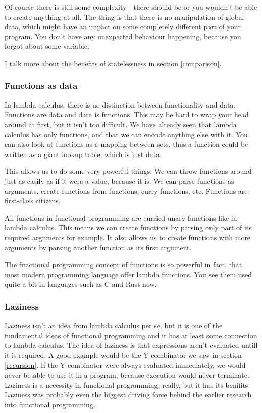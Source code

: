 \documentclass[11pt]{article}
\begin{document}
Of course there is still some complexity---there should be or you wouldn't be
able to create anything at all. The thing is that there is no manipulation of
global data, which might have an impact on some completely different part of
your program. You don't have any unexpected behaviour happening, because you
forgot about some variable.

I talk more about the benefits of statelessness in section \ref{comparison}.

\subsubsection{Functions as data}

In lambda calculus, there is no distinction between functionality and data.
Functions are data and data is functions. This may be hard to wrap your head
around at first, but it isn't too difficult. We have already seen that lambda
calculus has only functions, and that we can encode anything else with it. You
can also look at functions as a mapping between sets, thus a function could be
written as a giant lookup table, which is just data.

This allows us to do some very powerful things. We can throw functions around
just as easily as if it were a value, because it is. We can parse functions as
arguments, create functions from functions, curry functions, etc. Functions are
first-class citizens.

All functions in functional programming are curried unary functions like in
lambda calculus. This means we can create functions by parsing only part of its
required arguments for example. It also allows us to create functions with more
arguments by parsing another function as its first argument.

The functional programming concept of functions is so powerful in fact, that
most modern programming language offer lambda functions. You see them used
quite a bit in languages such as C and Rust now.

\subsubsection{Laziness}\label{laziness}

Laziness isn't an idea from lambda calculus per se, but it is one of the
fundamental ideas of functional programming and it has at least some connection
to lambda calculus. The idea of laziness is that expressions aren't evaluated
untill it is required. A good example would be the Y-combinator we saw in
section \ref{recursion}. If the Y-combinator were always evaluated immediately,
we would never be able to use it in a program, because exccution would never
terminate. Laziness is a necessity in functional programming, really, but it
has its benifits. Laziness was probably even the biggest driving force behind
the earlier research into functional programming.
\end{document}
